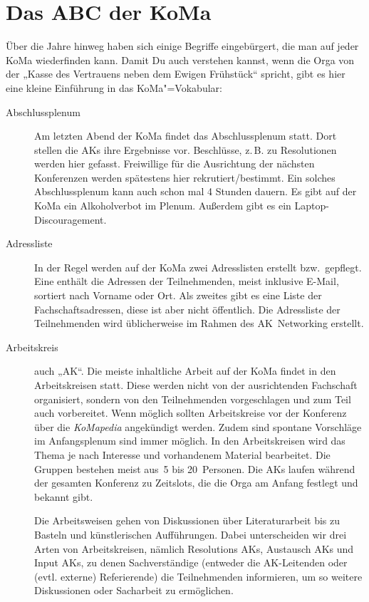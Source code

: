 \chapter{Das ABC der KoMa}

Über die Jahre hinweg haben sich einige Begriffe eingebürgert, die man auf jeder KoMa wiederfinden kann. Damit Du auch verstehen kannst, wenn die Orga von der „Kasse des Vertrauens neben dem Ewigen Frühstück“ spricht, gibt es hier eine kleine Einführung in das KoMa"=Vokabular:

\begin{description}
\item[Abschlussplenum]
    Am letzten Abend der KoMa findet das Abschlussplenum statt. Dort stellen die AKs ihre Ergebnisse vor. Beschlüsse, z.\,B. zu Resolutionen werden hier gefasst.  Freiwillige für die Ausrichtung der nächsten Konferenzen werden spätestens hier rekrutiert/bestimmt. Ein solches Abschlussplenum kann auch schon mal 4 Stunden dauern. Es gibt auf der KoMa ein Alkoholverbot im Plenum. Außerdem gibt es ein Laptop-Discouragement.

\item[Adressliste]
    In der Regel werden auf der KoMa zwei Adresslisten erstellt bzw.\ gepflegt. Eine enthält die Adressen der Teilnehmenden, meist inklusive E-Mail, sortiert nach Vorname oder Ort.  Als zweites gibt es eine Liste der Fachschaftsadressen, diese ist aber nicht öffentlich. Die Adressliste der Teilnehmenden wird üblicherweise im Rahmen des AK~Networking erstellt.

\item[Arbeitskreis]
    auch „AK“. Die meiste inhaltliche Arbeit auf der KoMa findet in den Arbeitskreisen statt. Diese werden nicht von der ausrichtenden Fachschaft organisiert, sondern von den Teilnehmenden vorgeschlagen und zum Teil auch vorbereitet. Wenn möglich sollten Arbeitskreise vor der Konferenz über die \emph{KoMapedia} angekündigt werden. Zudem sind spontane Vorschläge im Anfangsplenum sind immer möglich. In den Arbeitskreisen wird das Thema je nach Interesse und vorhandenem Material bearbeitet. Die Gruppen bestehen meist aus~5 bis 20~Personen. Die AKs laufen während der gesamten Konferenz zu Zeitslots, die die Orga am Anfang festlegt und bekannt gibt.
	
	Die Arbeitsweisen gehen	von Diskussionen über Literaturarbeit bis zu Basteln und künstlerischen Aufführungen. Dabei unterscheiden wir drei Arten von Arbeitskreisen, nämlich Resolutions AKs, Austausch AKs und Input AKs, zu denen Sachverständige (entweder die AK-Leitenden oder (evtl. externe) Referierende) die Teilnehmenden informieren, um so weitere Diskussionen oder Sacharbeit zu ermöglichen.


\end{description}
